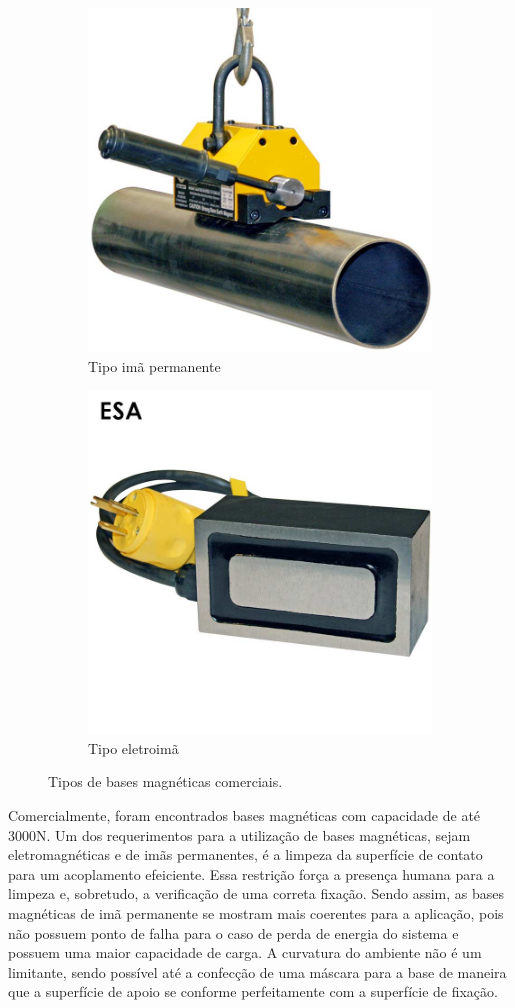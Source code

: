 \begin{figure}[H]
\begin{subfigure}[b]{0.5\columnwidth}
  \centering
  \includegraphics[width=.7\columnwidth]{sota/figs/base/mangnetpipe}
  \caption{Tipo imã permanente}
  \label{fig:sfig1}
\end{subfigure}%
\begin{subfigure}[b]{0.4\columnwidth}
  \centering
  \includegraphics[width=.7\columnwidth]{sota/figs/base/eletromagnet}
  \caption{Tipo eletroimã}
  \label{fig:sfig2}
\end{subfigure}
\caption{Tipos de bases magnéticas comerciais.}
\label{fig::base::imas}
\end{figure}

Comercialmente, foram encontrados bases magnéticas com capacidade de até 3000N.
Um dos requerimentos para a utilização de bases magnéticas, sejam
eletromagnéticas e de imãs permanentes, é a limpeza da superfície de contato
para um acoplamento efeiciente. Essa restrição força a presença humana para a
limpeza e, sobretudo, a verificação de uma correta fixação. Sendo assim, as
bases magnéticas de imã permanente se mostram mais coerentes para a aplicação,
pois não possuem ponto de falha para o caso de perda de energia do sistema e
possuem uma maior capacidade de carga. A curvatura do ambiente não é um
limitante, sendo possível até a confecção de uma máscara para a base de maneira
que a superfície de apoio se conforme perfeitamente com a superfície de fixação.
